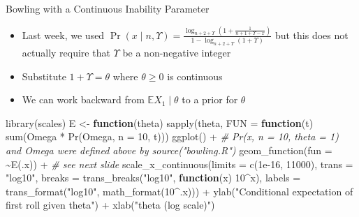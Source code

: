 \documentclass[
  ignorenonframetext,
]{beamer}
\newenvironment{Shaded}{\begin{snugshade}}{\end{snugshade}}
\newcommand{\AttributeTok}[1]{\textcolor[rgb]{0.77,0.63,0.00}{#1}}
\newcommand{\CommentTok}[1]{\textcolor[rgb]{0.56,0.35,0.01}{\textit{#1}}}
\newcommand{\ControlFlowTok}[1]{\textcolor[rgb]{0.13,0.29,0.53}{\textbf{#1}}}
\newcommand{\DecValTok}[1]{\textcolor[rgb]{0.00,0.00,0.81}{#1}}
\newcommand{\FloatTok}[1]{\textcolor[rgb]{0.00,0.00,0.81}{#1}}
\newcommand{\FunctionTok}[1]{\textcolor[rgb]{0.00,0.00,0.00}{#1}}
\newcommand{\NormalTok}[1]{#1}
\newcommand{\OtherTok}[1]{\textcolor[rgb]{0.56,0.35,0.01}{#1}}
\newcommand{\SpecialCharTok}[1]{\textcolor[rgb]{0.00,0.00,0.00}{#1}}
\newcommand{\StringTok}[1]{\textcolor[rgb]{0.31,0.60,0.02}{#1}}
\providecommand{\tightlist}{%
  \setlength{\itemsep}{0pt}\setlength{\parskip}{0pt}}
\begin{document}
\begin{frame}[fragile]{Bowling with a Continuous Inability Parameter}
\protect\hypertarget{bowling-with-a-continuous-inability-parameter}{}
\begin{itemize}
\tightlist
\item
  Last week, we used
  \(\Pr\left(x \mid n, \Upsilon\right) = \frac{\log_{n + 2 + \Upsilon}\left(1 + \frac{1}{n + 1 + \Upsilon - x}\right)}{1 - \log_{n + 2 + \Upsilon}\left(1 + \Upsilon\right)}\)
  but this does not actually require that \(\Upsilon\) be a non-negative
  integer
\item
  Substitute \(1 + \Upsilon = \theta\) where \(\theta \geq 0\) is
  continuous
\item
  We can work backward from \(\mathbb{E}X_1 \mid \theta\) to a prior for
  \(\theta\)
\end{itemize}

\begin{Shaded}
\begin{Highlighting}[]
\FunctionTok{library}\NormalTok{(scales)}
\NormalTok{E }\OtherTok{\textless{}{-}} \ControlFlowTok{function}\NormalTok{(theta) }\FunctionTok{sapply}\NormalTok{(theta, }\AttributeTok{FUN =} \ControlFlowTok{function}\NormalTok{(t) }\FunctionTok{sum}\NormalTok{(Omega }\SpecialCharTok{*} \FunctionTok{Pr}\NormalTok{(Omega, }\AttributeTok{n =} \DecValTok{10}\NormalTok{, t)))}
\FunctionTok{ggplot}\NormalTok{() }\SpecialCharTok{+} \CommentTok{\# Pr(x, n = 10, theta = 1) and Omega were defined above by source("bowling.R")}
  \FunctionTok{geom\_function}\NormalTok{(}\AttributeTok{fun =} \SpecialCharTok{\textasciitilde{}}\FunctionTok{E}\NormalTok{(.x)) }\SpecialCharTok{+} \CommentTok{\# see next slide}
  \FunctionTok{scale\_x\_continuous}\NormalTok{(}\AttributeTok{limits =} \FunctionTok{c}\NormalTok{(}\FloatTok{1e{-}16}\NormalTok{, }\DecValTok{11000}\NormalTok{), }\AttributeTok{trans  =} \StringTok{"log10"}\NormalTok{,}
                     \AttributeTok{breaks =} \FunctionTok{trans\_breaks}\NormalTok{(}\StringTok{"log10"}\NormalTok{, }\ControlFlowTok{function}\NormalTok{(x) }\DecValTok{10}\SpecialCharTok{\^{}}\NormalTok{x),}
                     \AttributeTok{labels =} \FunctionTok{trans\_format}\NormalTok{(}\StringTok{"log10"}\NormalTok{, }\FunctionTok{math\_format}\NormalTok{(}\DecValTok{10}\SpecialCharTok{\^{}}\NormalTok{.x))) }\SpecialCharTok{+}
  \FunctionTok{ylab}\NormalTok{(}\StringTok{"Conditional expectation of first roll given theta"}\NormalTok{) }\SpecialCharTok{+}
  \FunctionTok{xlab}\NormalTok{(}\StringTok{"theta (log scale)"}\NormalTok{)}
\end{Highlighting}
\end{Shaded}
\end{frame}
\end{document}
